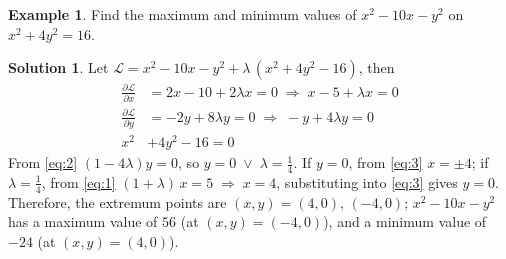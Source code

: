 \documentclass[10pt]{beamer}
\newcommand{\ds}{\displaystyle}
\newcommand{\ie}{\;\Longrightarrow\;}
\newcommand{\orr}{\;\vee\;}
\theoremstyle{definition}
\newtheorem*{ex}{Example}
\newtheorem*{sol}{Solution}
\newcommand{\pdiff}[2]{\frac{\partial #1}{\partial #2}}
\begin{document}
\begin{frame}
\begin{ex} 
  Find the maximum and minimum values of $\ds x^2 - 10 x - y^2$ on $\ds x^2 + 4 y^2 = 16$. 
\end{ex}

\begin{sol}
  Let $\ds\mathcal{L} = x^2 - 10 x - y^2 + \lambda\,(x^2 + 4 y^2 - 16)$, then 
  \begin{align}
    \pdiff{\mathcal{L}}{x} &= 2 x - 10 + 2\lambda x = 0\ie x - 5 + \lambda x = 0 \label{eq:1}\\
    \pdiff{\mathcal{L}}{y} &= -2y + 8\lambda y = 0\ie -y + 4\lambda y = 0 \label{eq:2} \\
    x^2 &+ 4 y^2 - 16 = 0 \label{eq:3}
  \end{align}
  From \eqref{eq:2} $(1 - 4\lambda) y = 0$, so $y = 0\orr\lambda = \frac{1}{4}$. If $y = 0$, from \eqref{eq:3} $x = \pm 4$; if $\lambda=\frac{1}{4}$, from \eqref{eq:1} $(1 + \lambda)\,x = 5\ie x = 4$, substituting into \eqref{eq:3} gives $y = 0$. Therefore, the extremum points are $(x, y) = (4, 0),\,(-4, 0)$; $x^2 - 10x - y^2$ has a maximum value of $56$ (at $(x, y) = (-4, 0)$), and a minimum value of $-24$ (at $(x, y) = (4, 0)$). 
\end{sol}
\end{frame}

%
\end{document}
